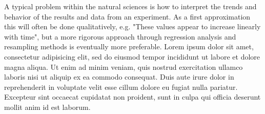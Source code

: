 
A typical problem within the natural sciences is how to interpret the trends and behavior of the results and data from an experiment. As a first approximation this will often be done qualitatively, e.g. "These values appear to increase linearly with time", but a more rigorous approach through regression analysis and resampling methods is eventually more preferable.
Lorem ipsum dolor sit amet, consectetur adipisicing elit, sed do eiusmod
tempor incididunt ut labore et dolore magna aliqua. Ut enim ad minim veniam,
quis nostrud exercitation ullamco laboris nisi ut aliquip ex ea commodo
consequat. Duis aute irure dolor in reprehenderit in voluptate velit esse
cillum dolore eu fugiat nulla pariatur. Excepteur sint occaecat cupidatat non
proident, sunt in culpa qui officia deserunt mollit anim id est laborum.
